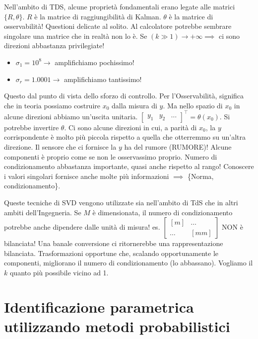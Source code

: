 Nell'ambito di TDS, alcune proprietà fondamentali erano legate alle matrici $\{R,\theta\}$. $R$ è la matrice di raggiungibilità di Kalman. $\theta$ è la matrice di osservabilità! Questioni delicate al solito. Al calcolatore potrebbe sembrare singolare una matrice che in realtà non lo è. Se $(k\gg 1)\to +\infty \implies$ ci sono direzioni abbastanza privilegiate!

\begin{itemize}

\item{$\sigma_1=10^8 \rightarrow$} amplifichiamo pochissimo!
\item{$\sigma_r=1.0001 \rightarrow$} amplifichiamo tantissimo!

\end{itemize}

Questo dal punto di vista dello sforzo di controllo. Per l'Osservabilità, significa che in teoria possiamo costruire $x_0$ dalla misura di $y$. Ma nello spazio di $x_0$ in alcune direzioni abbiamo un'uscita unitaria. $\begin{bmatrix}y_1&y_2&\dots\end{bmatrix}^\top = \theta(x_0)$. Si potrebbe invertire $\theta$. Ci sono alcune direzioni in cui, a parità di $x_0$, la $y$ corrispondente è molto più piccola rispetto a quella che otterremmo su un'altra direzione. Il sensore che ci fornisce la $y$ ha del rumore (RUMORE)! Alcune componenti è proprio come se non le osservassimo proprio. Numero di condizionamento abbastanza importante, quasi anche rispetto al rango! Conoscere i valori singolari fornisce anche molte più informazioni $\implies$ \{Norma, condizionamento\}.

Queste tecniche di SVD vengono utilizzate sia nell'ambito di TdS che in altri ambiti dell'Ingegneria. Se $M$ è dimensionata, il numero di condizionamento potrebbe anche dipendere dalle unità di misura! es. $\begin{bmatrix}[m]&\dots\\\dots&[mm]\end{bmatrix}$ NON è bilanciata! Una banale conversione ci ritornerebbe una rappresentazione bilanciata. Trasformazioni opportune che, scalando opportunamente le componenti, migliorano il numero di condizionamento (lo abbassano). Vogliamo il $k$ quanto più possibile vicino ad 1.

\section{Identificazione parametrica utilizzando metodi probabilistici}

